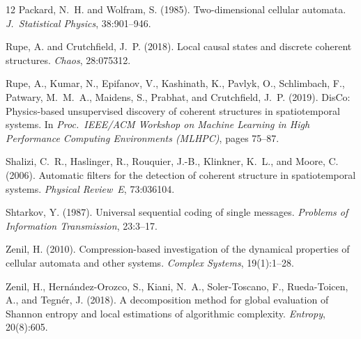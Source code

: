 \documentclass[letterpaper]{article}
\begin{document}
\begin{thebibliography}{12}
Packard, N.~H. and Wolfram, S. (1985).
Two-dimensional cellular automata.
\emph{J.\ Statistical Physics}, 38:901--946.

Rupe, A. and Crutchfield, J.~P. (2018).
Local causal states and discrete coherent structures.
\emph{Chaos}, 28:075312.

Rupe, A., Kumar, N., Epifanov, V., Kashinath, K., Pavlyk, O., Schlimbach, F.,
Patwary, M.~M.~A., Maidens, S., Prabhat, and Crutchfield, J.~P. (2019).
DisCo: Physics-based unsupervised discovery of coherent structures in
spatiotemporal systems.
In \emph{Proc.\ IEEE/ACM Workshop on Machine Learning in High Performance
Computing Environments (MLHPC)}, pages 75--87.

Shalizi, C.~R., Haslinger, R., Rouquier, J.-B., Klinkner, K.~L., and Moore, C. (2006).
Automatic filters for the detection of coherent structure in spatiotemporal systems.
\emph{Physical Review~E}, 73:036104.

Shtarkov, Y. (1987).
Universal sequential coding of single messages.
\emph{Problems of Information Transmission}, 23:3--17.

Zenil, H. (2010).
Compression-based investigation of the dynamical properties of cellular automata and other systems.
\emph{Complex Systems}, 19(1):1--28.

Zenil, H., Hern{\'a}ndez-Orozco, S., Kiani, N.~A., Soler-Toscano, F.,
Rueda-Toicen, A., and Tegn{\'e}r, J. (2018).
A decomposition method for global evaluation of Shannon entropy and local
estimations of algorithmic complexity.
\emph{Entropy}, 20(8):605.

\end{thebibliography}
\end{document}
